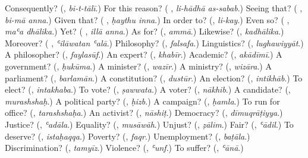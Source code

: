 \begin{tcolorbox}[breakable,colback=teal!4,colframe=teal!35!black,title={Before you move on}]
Consequently? (\textbf{}, \emph{bi-t-tālī}.) For this reason? (\textbf{ }, \emph{li-hādhā as-sabab}.) Seeing that? (\textbf{ }, \emph{bi-mā anna}.) Given that? (\textbf{ }, \emph{ḥaythu inna}.) In order to? (\textbf{}, \emph{li-kay}.) Even so? (\textbf{ }, \emph{maʿa dhālika}.) Yet? (\textbf{ }, \emph{illā anna}.) As for? (\textbf{}, \emph{ammā}.) Likewise? (\textbf{}, \emph{kadhālika}.) Moreover? (\textbf{ }, \emph{ʿilāwatan ʿalā}.) Philosophy? (\textbf{}, \emph{falsafa}.) Linguistics? (\textbf{}, \emph{lughawiyyāt}.) A philosopher? (\textbf{}, \emph{faylasūf}.) An expert? (\textbf{}, \emph{khabīr}.) Academic? (\textbf{}, \emph{akādīmī}.) A government? (\textbf{}, \emph{ḥukūma}.) A minister? (\textbf{}, \emph{wazīr}.) A ministry? (\textbf{}, \emph{wizāra}.) A parliament? (\textbf{}, \emph{barlamān}.) A constitution? (\textbf{}, \emph{dustūr}.) An election? (\textbf{}, \emph{intikhāb}.) To elect? (\textbf{}, \emph{intakhaba}.) To vote? (\textbf{}, \emph{ṣawwata}.) A voter? (\textbf{}, \emph{nākhib}.) A candidate? (\textbf{}, \emph{murashshaḥ}.) A political party? (\textbf{}, \emph{ḥizb}.) A campaign? (\textbf{}, \emph{ḥamla}.) To run for office? (\textbf{}, \emph{tarashshaḥa}.) An activist? (\textbf{}, \emph{nāshiṭ}.) Democracy? (\textbf{}, \emph{dīmuqrāṭiyya}.) Justice? (\textbf{}, \emph{ʿadāla}.) Equality? (\textbf{}, \emph{musāwāh}.) Unjust? (\textbf{}, \emph{ẓālim}.) Fair? (\textbf{}, \emph{ʿādil}.) To deserve? (\textbf{}, \emph{istaḥaqqa}.) Poverty? (\textbf{}, \emph{faqr}.) Unemployment? (\textbf{}, \emph{baṭāla}.) Discrimination? (\textbf{}, \emph{tamyīz}.) Violence? (\textbf{}, \emph{ʿunf}.) To suffer? (\textbf{}, \emph{ʿānā}.)
\end{tcolorbox}

